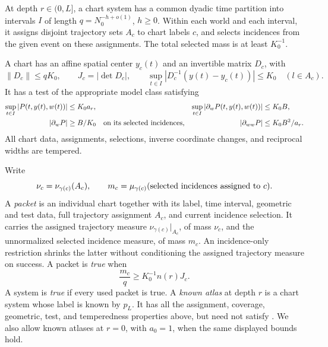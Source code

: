 \begin{definition}
\label{def:true-chart}
At depth \(r\in(0,L]\), a chart system has a common dyadic
time partition into intervals \(I\) of length
\(q=N_0^{-h+o(1)}\), \(h\ge0\).
Within each world and each interval, it assigns disjoint
trajectory sets \(A_c\) to chart labels \(c\), and selects
incidences from the given event on these assignments.
The total selected mass is at least \(K_0^{-1}\).

A chart has an affine spatial center \(y_c(t)\) and an
invertible matrix \(D_c\), with
\begin{equation}
 \|D_c\|\le qK_0,\qquad J_c=|\det D_c|,\qquad
 \sup_{t\in I}|D_c^{-1}(y(t)-y_c(t))|\le K_0
       \quad(l\in A_c).
 \label{a01:chart-space}
\end{equation}
It has a test of the appropriate model class satisfying
\begin{align}
 \sup_{t\in I}|P(t,y(t),w(t))|&\le K_0a_r,
 &
 \sup_{t\in I}|\partial_wP(t,y(t),w(t))|&\le K_0B,
 \label{a01:chart-test}\\
 |\partial_wP|&\ge B/K_0
       \quad\hbox{on its selected incidences},
 &
 |\partial_{ww}P|&\le K_0B^2/a_r.
 \notag
\end{align}
All chart data, assignments, selections, inverse coordinate
changes, and reciprocal widths are tempered.

Write
\[
 \nu_c=\nu_{\gamma(c)}(A_c),\qquad
 m_c=\mu_{\gamma(c)}(\hbox{selected incidences assigned to }c).
\]
A \emph{packet} is an individual chart together with its label,
time interval, geometric and test data, full trajectory assignment
\(A_c\), and current incidence selection. It carries the assigned
trajectory measure \(\nu_{\gamma(c)}|_{A_c}\), of mass \(\nu_c\),
and the unnormalized selected incidence measure, of mass \(m_c\).
An incidence-only restriction shrinks the latter without
conditioning the assigned trajectory measure on success.
A packet is \emph{true} when
\begin{equation}
 \frac{m_c}{q}\ge K_0^{-1}n(r)J_c.
 \label{a01:true-floor}
\end{equation}
A system is \emph{true} if every used packet is true.
A \emph{known atlas} at depth \(r\) is a chart system whose
label is known by \(p_L\). It has all the assignment, coverage,
geometric, test, and temperedness properties above, but need not
satisfy .
We also allow known atlases at \(r=0\), with \(a_0=1\),
when the same displayed bounds hold.
\end{definition}

